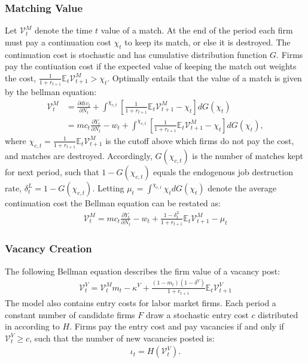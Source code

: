 \subsubsection{Matching Value}
Let $\mathcal{V}_{t}^{M}$ denote the time $t$ value of a match. At the end of the period each firm must pay a continuation cost $\chi_{t}$ to keep its match, or else it is destroyed. The continuation cost is stochastic and has cumulative distribution function $G$. Firms pay the contiuation cost if the expected value of keeping the match out weights the cost, $\frac{1}{1+r_{t+1}}\mathbb{E}_{t}\mathcal{V}_{t+1}^{M}>\chi_{t}$. Optimally entails that the value of a match is given by the bellman equation:
\begin{align*}
\mathcal{V}_{t}^{M}&=\frac{\partial div_{t}}{\partial N_{t}}+\int^{\chi_{c,t}}\left[\frac{1}{1+r_{t+1}}\mathbb{E}_{t}\mathcal{V}_{t+1}^{M}-\chi_{t}\right]dG\left(\chi_{t}\right) \\
&=mc_{t}\frac{\partial Y_{t}}{\partial N_{t}}-w_{t}+\int^{\chi_{c,t}}\left[\frac{1}{1+r_{t+1}}\mathbb{E}_{t}\mathcal{V}_{t+1}^{M}-\chi_{t}\right]dG\left(\chi_{t}\right),
\end{align*}
where $\chi_{c,t}=\frac{1}{1+r_{t+1}}\mathbb{E}_{t}\mathcal{V}_{t+1}^{M}$ is the cutoff above which firms do not pay the cost, and matches are destroyed. Accordingly, $G\left(\chi_{c,t}\right)$ is the number of matches kept for next period, such that $1-G\left(\chi_{c,t}\right)$ equals the endogenous job destruction rate, $\delta_{t}^{L}=1-G\left(\chi_{c,t}\right)$. Letting $\mu_{t}=\int^{\chi_{c,t}}\chi_{t}dG\left(\chi_{t}\right)$ denote the average continuation cost the Bellman equation can be restated as: 
\begin{gather*}
\mathcal{V}_{t}^{M}=mc_{t}\frac{\partial Y_{t}}{\partial N_{t}}-w_{t}+\frac{1-\delta_{t}^{L}}{1+r_{t+1}}\mathbb{E}_{t}\mathcal{V}_{t+1}^{M}-\mu_{t}
\end{gather*}


\subsubsection{Vacancy Creation}
The following Bellman equation describes the firm value of a vacancy post:
\begin{gather*}
\mathcal{V}_{t}^{V}=\mathcal{V}_{t}^{M}m_{t}-\kappa^{V}+\frac{\left(1-m_{t}\right)\left(1-\delta^{V}\right)}{1+r_{t+1}}\mathbb{E}_{t}\mathcal{V}_{t+1}^{V}
\end{gather*}
The model also contains entry costs for labor market firms. Each period a constant number of candidate firms $F$ draw a stochastic entry cost $c$ distributed in according to $H$. Firms pay the entry cost and pay vacancies if and only if $\mathcal{V}_{t}^{V}\geq c$, such that the number of new vacancies posted is:
\begin{gather*}
\iota_{t}=H\left(\mathcal{V}_{t}^{V}\right).
\end{gather*}